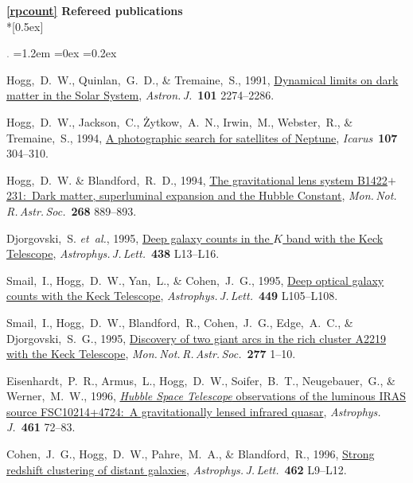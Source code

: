 \documentclass[10pt,letterpaper]{article}
\newcommand{\foreign}[1]{\textsl{#1}}
\newcommand{\etal}{\foreign{et~al.}}
\newcommand{\project}[1]{\textsl{#1}}
\newcommand{\doi}[2]{\href{http://dx.doi.org/#1}{{#2}}}
\newcommand{\ads}[2]{\href{http://adsabs.harvard.edu/abs/#1}{{#2}}}
\newcommand{\deemph}[1]{\textcolor{grey}{\footnotesize{#1}}}
\newcommand{\pubnumber}[1]{\deemph{{#1}.}}
\newcommand{\hoggheading}[1]{\addvspace{1.5ex}\pagebreak[3]%
    \par\textbf{#1}\nopagebreak%
    \afterpage{\markboth{David W. Hogg, curriculum vitae continued: \textbf{#1}}{}}%
    \nopagebreak\\*[0.5ex]\nopagebreak}%
\newcounter{refpubnum}
\newcommand{\hogglist}{%
    \rightmargin=0in
    \leftmargin=1.2em
    \topsep=0ex
    \partopsep=0pt
    \itemsep=0.2ex
    \parsep=0pt
    \itemindent=-1.0\leftmargin
    \listparindent=0.0\leftmargin
    \settowidth{\labelsep}{~}
    \usecounter{refpubnum}
  }
\begin{document}

\hypersetup{linkcolor=black}%
\hoggheading{\ref{rpcount} Refereed publications}%
\hypersetup{linkcolor=grey}%
\begin{list}{\pubnumber{\therefpubnum}}{\hogglist}
\item
Hogg,~D.~W., Quinlan,~G.~D., \& Tremaine,~S., 1991,
\doi{10.1086/115849}{Dynamical limits on dark matter in the Solar System},
\textit{Astron.\,J.}\ \textbf{101} 2274--2286.
\item
Hogg,~D.~W., Jackson,~C., \.Zytkow,~A.~N., Irwin,~M., Webster,~R., \& Tremaine,~S., 1994,
\doi{10.1006/icar.1994.1025}{A photographic search for satellites of Neptune},
\textit{Icarus}\ \textbf{107} 304--310.
\item
Hogg,~D.~W. \& Blandford,~R.~D., 1994,
\ads{1994MNRAS.268..889H}{The gravitational lens system B1422$+$231:\ Dark matter, superluminal expansion and the Hubble Constant},
\textit{Mon.\,Not.\,R.\,Astr.\,Soc.}\ \textbf{268} 889--893.
\item
Djorgovski,~S. \etal, 1995,
\doi{10.1086/187703}{Deep galaxy counts in the $K$ band with the Keck Telescope},
\textit{Astrophys.\,J.\,Lett.}\ \textbf{438} L13--L16.
\item
Smail,~I., Hogg,~D.~W., Yan,~L., \& Cohen,~J.~G., 1995,
\doi{10.1086/309647}{Deep optical galaxy counts with the Keck Telescope},
\textit{Astrophys.\,J.\,Lett.}\ \textbf{449} L105--L108.
\item
Smail,~I., Hogg,~D.~W., Blandford,~R., Cohen,~J.~G., Edge,~A.~C., \& Djorgovski,~S.~G., 1995,
\ads{1995MNRAS.277....1S}{Discovery of two giant arcs in the rich cluster A2219 with the Keck Telescope},
\textit{Mon.\,Not.\,R.\,Astr.\,Soc.}\ \textbf{277} 1--10.
\item
Eisenhardt,~P.~R., Armus,~L., Hogg,~D.~W., Soifer,~B.~T., Neugebauer,~G., \& Werner,~M.~W., 1996,
\doi{10.1086/177038}{\project{Hubble Space Telescope} observations of the luminous IRAS source FSC10214+4724:\ A gravitationally lensed infrared quasar},
\textit{Astrophys.\,J.}\ \textbf{461} 72--83.
\item
Cohen,~J.~G., Hogg,~D.~W., Pahre,~M.~A., \& Blandford,~R., 1996,
\doi{10.1086/310020}{Strong redshift clustering of distant galaxies},
\textit{Astrophys.\,J.\,Lett.}\ \textbf{462} L9--L12.

\end{list}
\end{document}
